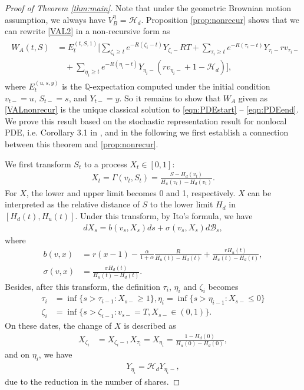 \documentclass[draft, noinfoline]{ectaart}
\numberwithin{equation}{section}
\theoremstyle{plain}
\begin{document}
\begin{appendices}
\begin{proof}[Proof of Theorem \ref{thm:main}]
	Note that under the geometric Brownian motion assumption, we always have $V^\eta_B=\mathcal{H}_d$. Proposition \ref{prop:nonrecur} shows that we can rewrite \eqref{VAL2} in a non-recursive form as
	\begin{align*}
	\begin{split}
	W_A(t,S)&=E_t^{(t,S,1)}\Bigg[\sum_{\zeta_i\ge t}e^{-R(\zeta_i-t)}Y_{\zeta_i-}RT+\sum_{\tau_i\ge t}e^{-R(\tau_i-t)}Y_{\tau_i-}rv_{\tau_i-}\\
	&\quad+\sum_{\eta_i\ge t}e^{-R(\eta_i-t)}Y_{\eta_i-}(rv_{\eta_i-}+1-\mathcal{H}_d)\Bigg],
	\end{split}
	\end{align*}
	where $E^{(u,s,y)}_t$ is the $\mathbb{Q}$-expectation computed under the initial condition $v_{t-}=u$, $S_{t-}=s$, and $Y_{t-}=y$. So it remains to show that $W_A$ given as \eqref{VALnonrecur} is the unique classical solution to \eqref{eqn:PDEstart} -- \eqref{eqn:PDEend}. We prove this result based on the stochastic representation result for nonlocal PDE, i.e. Corollary 3.1 in \cite{dai_stochastic_2017}, and in the following we first establish a connection between this theorem and \eqref{prop:nonrecur}.

	We first transform $S_t$ to a process $X_t\in[0,1]$:
	\begin{align*}
		X_t=\Gamma(v_t,S_t)=\frac{S-H_d(v_t)}{H_u(v_t)-H_d(v_t)}.
	\end{align*}
	For $X$, the lower and upper limit becomes 0 and 1, respectively. $X$ can be interpreted as the relative distance of $S$ to the lower limit $H_d$ in $[H_d(t),H_u(t)]$. Under this transform, by Ito's formula, we have
	\begin{align*}
		dX_s=b(v_s,X_s)ds+\sigma(v_s,X_s)d\mathcal{B}_s,
	\end{align*}
	where
	\begin{align*}
		b(v,x)&=r(x-1)-\frac{\alpha}{1+\alpha}\frac{R}{H_u(t)-H_d(t)}+\frac{rH_u(t)}{H_u(t)-H_d(t)},\\
		\sigma(v,x)&=\frac{\sigma H_d(t)}{H_u(t)-H_d(t)}.
	\end{align*}
	Besides, after this transform, the definition $\tau_i$, $\eta_i$ and $\zeta_i$ becomes
	\begin{align*}
		\tau_i&=\inf\{s>\tau_{i-1}:X_{s-}\ge 1\},\eta_i=\inf\{s>\eta_{i-1}:X_{s-}\le 0\}\\
		\zeta_i&=\inf\{s>\zeta_{i-1}:v_{s-}=T,X_{s-}\in(0,1)\}.
	\end{align*}
	On these dates, the change of $X$ is described as
	\begin{align*}
		X_{\zeta_i}&=X_{\zeta_i-}, X_{\tau_i}=X_{\eta_i}=\frac{1-H_d(0)}{H_u(0)-H_d(0)},
	\end{align*}
	and on $\eta_i$, we have
	\begin{align*}
		Y_{\eta_i}=\mathcal{H}_d Y_{\eta_i-},
	\end{align*}
	due to the reduction in the number of shares.


\end{proof}
\end{appendices}
\end{document}
